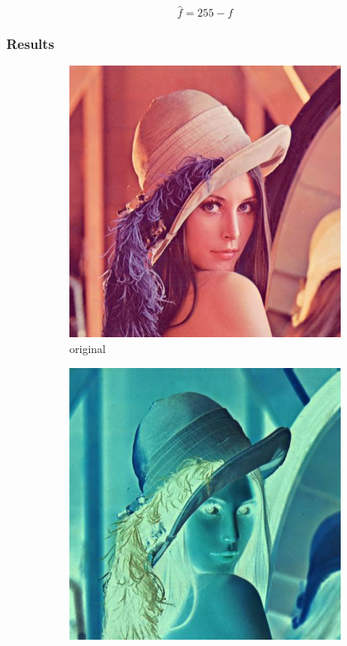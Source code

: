 \documentclass[12pt]{article}
\begin{document}
\begin{equation}
    \hat{f} = 255 - f
\end{equation}

\subsubsection{Results}

\begin{figure}[H]\centering
    \begin{subfigure}[t]{\subfiguresize}\centering
        \includegraphics[width=\textwidth]{lenac.png}
        \caption{original}
    \end{subfigure}
    \hspace{.05\textwidth}
    \begin{subfigure}[t]{\subfiguresize}\centering
        \includegraphics[width=\textwidth]{lenac_negative.png}

\end{subfigure}
\end{figure}
\end{document}
